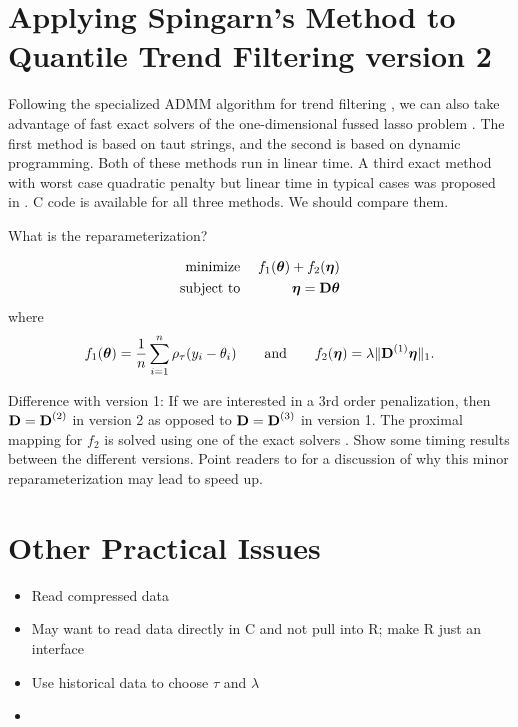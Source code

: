 \documentclass{article}
\newcommand{\V}[1]{{\bm{\mathbf{\MakeLowercase{#1}}}}} %
\newcommand{\VE}[2]{\MakeLowercase{#1}_{#2}} %
\newcommand{\M}[1]{{\bm{\mathbf{\MakeUppercase{#1}}}}} %
\newcommand{\Mn}[2]{\M{#1}^{(#2)}} %
\begin{document}
\section{Applying Spingarn's Method to Quantile Trend Filtering version 2}

Following the specialized ADMM algorithm for trend filtering \cite{Ramdas2016}, we can also take advantage of fast exact solvers of the one-dimensional fussed lasso problem \cite{davies2001, Johnson2013}. The first method is based on taut strings, and the second is based on dynamic programming. Both of these methods run in linear time. A third exact method with worst case quadratic penalty but linear time in typical cases was proposed in \cite{Condat2013}. C code is available for all three methods. We should compare them.

What is the reparameterization?

\begin{eqnarray*}
\text{minimize}\; && f_1(\V{\theta}) + f_2(\V{\eta}) \\
\text{subject to}\; && \V{\eta} = \M{D}\V{\theta}
\end{eqnarray*}
where
\begin{eqnarray*}
f_1(\V{\theta}) = \frac{1}{n}\sum_{i=1}^n \rho_\tau(\VE{y}{i} - \VE{\theta}{i}) \quad\quad \text{and} \quad\quad
f_2(\V{\eta}) = \lambda\lVert \Mn{D}{1}\V{\eta} \rVert_1.
\end{eqnarray*}

Difference with version 1: If we are interested in a 3rd order penalization, then $\M{D} = \Mn{D}{2}$ in version 2 as opposed to $\M{D} = \Mn{D}{3}$ in version 1. The proximal mapping for $f_2$ is solved using one of the exact solvers \cite{davies2001, Johnson2013, Condat2013}. Show some timing results between the different versions. Point readers to \cite{Ramdas2016} for a discussion of why this minor reparameterization may lead to speed up.

\section{Other Practical Issues}

\begin{itemize}
	\item Read compressed data
	\item May want to read data directly in C and not pull into R; make R just an interface
	\item Use historical data to choose $\tau$ and $\lambda$
	\item 
\end{itemize}



\end{document}
